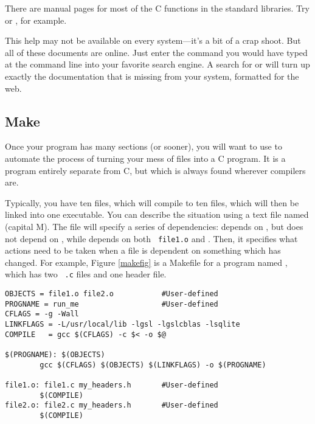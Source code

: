 There are manual pages for most of the C functions in the standard
libraries. Try  or , for example.

This help may not be available on every system---it's a bit of
a crap shoot. But all of these documents are online. Just enter the
command you would have typed at the command line into your favorite
search engine. A search for  or  will
turn up exactly the documentation that is missing from your system,
formatted for the web.

\subsection{Make} \label{make} 
Once your program has many sections (or sooner), you will want to use
 to automate the process of turning your mess of files into
a C program.  It is a program entirely separate from C, but which
is always found wherever compilers are.

Typically, you have ten  files, which will compile
to ten  files, which will then be linked into one executable.
You can describe the situation using a
text file named  (capital M). The file will specify a
series of dependencies:  depends on , but does
not depend on , while  depends on both {\tt
file1.o} and .  Then, it specifies what actions need to be taken
when a file is dependent on something which has changed.  For example,
Figure \ref{makefig} is a Makefile for a program named , which has two {\tt
.c} files and one header file.

\begin{figure*}
\begin{verbatim}
OBJECTS = file1.o file2.o           #User-defined
PROGNAME = run_me                   #User-defined
CFLAGS = -g -Wall
LINKFLAGS = -L/usr/local/lib -lgsl -lgslcblas -lsqlite
COMPILE   = gcc $(CFLAGS) -c $< -o $@

$(PROGNAME): $(OBJECTS)
        gcc $(CFLAGS) $(OBJECTS) $(LINKFLAGS) -o $(PROGNAME)

file1.o: file1.c my_headers.h       #User-defined
        $(COMPILE)
file2.o: file2.c my_headers.h       #User-defined
        $(COMPILE)
\end{verbatim}
\caption{A sample Makefile for a program with two source files.}
\label{makefig}
\end{figure*}

